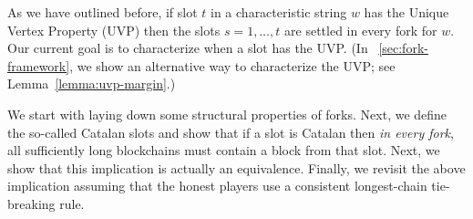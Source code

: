 As we have outlined before, 
if slot $t$ in a characteristic string $w$ 
has the Unique Vertex Property (UVP) 
then the slots $s = 1, \ldots, t$ 
are settled in every fork for $w$. 
Our current goal is to 
characterize when a slot has the UVP. 
(In \Section~\ref{sec:fork-framework}, we show an alternative way 
to characterize the UVP; see Lemma~\ref{lemma:uvp-margin}.) 

We start with laying down some structural properties of forks. 
Next, we define the so-called Catalan slots 
and show that if a slot is Catalan then \emph{in every fork}, all sufficiently long blockchains must contain a block from that slot. 
Next, we show that this implication is actually an equivalence. 
Finally, 
we revisit the above implication assuming 
that the honest players use a consistent longest-chain tie-breaking rule.





